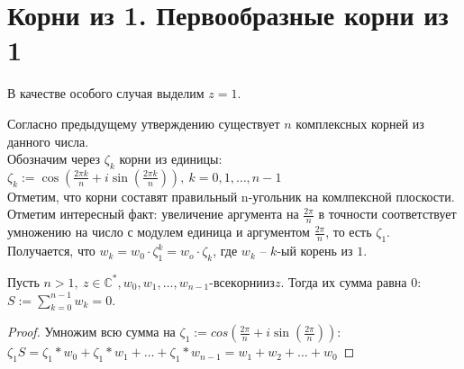 \section{Корни из 1. Первообразные корни из 1}
\begin{normalsize}
  \begin{theorem-non}
    В качестве особого случая выделим $z=1$.
  \end{theorem-non}
  Согласно предыдущему утверждению существует $n$ комплексных корней из данного числа. \\

  Обозначим через $\zeta_k$ корни из единицы: \\ 

  $\zeta_k := \cos(\frac{2\pi k}{n} + i\sin(\frac{2\pi k}{n})),\ k=0, 1, \dots, n-1$ \\

  Отметим, что корни составят правильный n-угольник на комлпексной плоскости. \\

  Отметим интересный факт: увеличение аргумента на $\frac{2\pi}{n}$ в точности соответствует умножению на число с модулем единица и аргументом $\frac{2\pi}{n}$, то есть $\zeta_1$. \\

  Получается, что $w_k = w_0\cdot\zeta_1^k = w_o\cdot\zeta_k$, где $w_k$ – $k$-ый корень из $1$.

  \begin{theorem-non}
    Пусть $n>1,\ z\in\mathbb{C}^*, w_0, w_1, \dots, w_{n-1}$-$все корни из z$. Тогда их сумма равна 0: $S:= \sum_{k=0}^{n-1}w_k = 0$. 
  \end{theorem-non}

  \begin{proof}
    Умножим всю сумма на $\zeta_1:=cos(\frac{2\pi}{n} + i\sin(\frac{2\pi}{n}))$: \\ 
    $\zeta_1S=\zeta_1*w_0 + \zeta_1*w_1 + \dots + \zeta_1*w_{n-1} = w_1 + w_2 + \dots + w_0$
  \end{proof} 
\end{normalsize}
